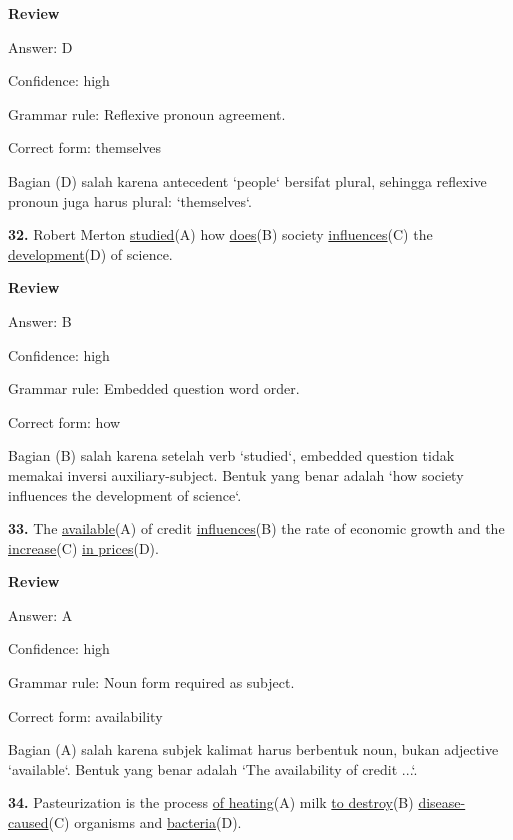 \documentclass[12pt]{article}
\begin{document}
\begingroup
\setlength{\parskip}{0pt}
\setlength{\parindent}{0pt}
\textbf{Review}\par
Answer: D\par
Confidence: high\par
Grammar rule: Reflexive pronoun agreement.\par
Correct form: themselves\par
Bagian (D) salah karena antecedent `people` bersifat plural, sehingga reflexive pronoun juga harus plural: `themselves`.\par
\endgroup
\par
\vspace{\questionblockgap}
\noindent\textbf{32.} Robert Merton \uline{studied}(A) how \uline{does}(B) society \uline{influences}(C) the \uline{development}(D) of science.
\par
\begingroup
\setlength{\parskip}{0pt}
\setlength{\parindent}{0pt}
\textbf{Review}\par
Answer: B\par
Confidence: high\par
Grammar rule: Embedded question word order.\par
Correct form: how\par
Bagian (B) salah karena setelah verb `studied`, embedded question tidak memakai inversi auxiliary-subject. Bentuk yang benar adalah `how society influences the development of science`.\par
\endgroup
\par
\vspace{\questionblockgap}
\noindent\textbf{33.} The \uline{available}(A) of credit \uline{influences}(B) the rate of economic growth and the \uline{increase}(C) \uline{in prices}(D).
\par
\begingroup
\setlength{\parskip}{0pt}
\setlength{\parindent}{0pt}
\textbf{Review}\par
Answer: A\par
Confidence: high\par
Grammar rule: Noun form required as subject.\par
Correct form: availability\par
Bagian (A) salah karena subjek kalimat harus berbentuk noun, bukan adjective `available`. Bentuk yang benar adalah `The availability of credit ...`.\par
\endgroup
\par
\vspace{\questionblockgap}
\noindent\textbf{34.} Pasteurization is the process \uline{of heating}(A) milk \uline{to destroy}(B) \uline{disease-caused}(C) organisms and \uline{bacteria}(D).
\end{document}
